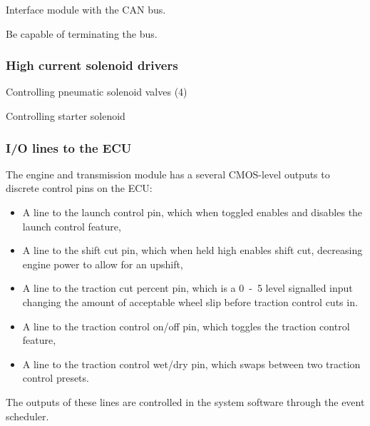 Interface module with the CAN bus.

Be capable of terminating the bus.


\subsubsection{High current solenoid drivers}


Controlling pneumatic solenoid valves (4)

Controlling starter solenoid


\subsubsection{I/O lines to the ECU}

The engine and transmission module has a several CMOS-level outputs to discrete control pins on the ECU:

\begin{itemize}
  \item A line to the launch control pin, which when toggled enables and disables the launch control feature,
  \item A line to the shift cut pin, which when held high enables shift cut, decreasing engine power to allow for an upshift,
  \item A line to the traction cut percent pin, which is a \unit{0-5}{\volt} level signalled input changing the amount of acceptable wheel slip before traction control cuts in.
  \item A line to the traction control on/off pin, which toggles the traction control feature,
  \item A line to the traction control wet/dry pin, which swaps between two traction control presets.
\end{itemize}

The outputs of these lines are controlled in the system software through the event scheduler. 